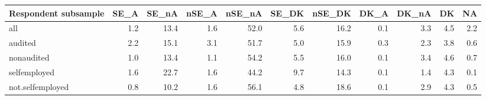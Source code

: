 \begin{table}[ht]
\centering
\begin{tabular}{lrrrrrrrrrr}
  \hline
Respondent subsample & SE\_A & SE\_nA & nSE\_A & nSE\_nA & SE\_DK & nSE\_DK & DK\_A & DK\_nA & DK & NA \\ 
  \hline
all & 1.2 & 13.4 & 1.6 & 52.0 & 5.6 & 16.2 & 0.1 & 3.3 & 4.5 & 2.2 \\ 
  audited & 2.2 & 15.1 & 3.1 & 51.7 & 5.0 & 15.9 & 0.3 & 2.3 & 3.8 & 0.6 \\ 
  nonaudited & 1.0 & 13.4 & 1.1 & 54.2 & 5.5 & 16.0 & 0.1 & 3.4 & 4.6 & 0.7 \\ 
  selfemployed & 1.6 & 22.7 & 1.6 & 44.2 & 9.7 & 14.3 & 0.1 & 1.4 & 4.3 & 0.1 \\ 
  not.selfemployed & 0.8 & 10.2 & 1.6 & 56.1 & 4.8 & 18.6 & 0.1 & 2.9 & 4.3 & 0.5 \\ 
   \hline
\end{tabular}
\end{table}
